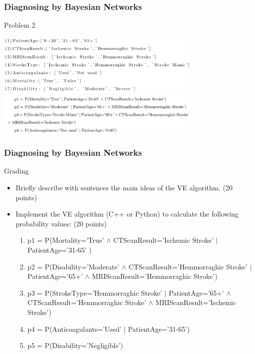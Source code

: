 \documentclass{beamer}
\begin{document}
\begin{frame}
  \frametitle{Diagnosing by Bayesian Networks}
  \begin{block}{Problem 2}

\includegraphics[width=10cm]{Pic/e21}
\includegraphics[width=10cm]{Pic/e22}
  \end{block}
\end{frame}



\begin{frame}
  \frametitle{Diagnosing by Bayesian Networks}

  \begin{block}{Grading}
\begin{itemize}
\item Briefly describe with sentences the main ideas of  the VE algorithm. (20 points)

\item Implement the VE algorithm (C++ or Python) to calculate the following probability values: (20 points)
    
\begin{enumerate}
\item p1 = P(Mortality='True' $\land$ CTScanResult='Ischemic Stroke' $|$ PatientAge='31-65' )

\item p2 = P(Disability='Moderate' $\land$ CTScanResult='Hemmorraghic Stroke' $|$ PatientAge='65+' $\land$  MRIScanResult='Hemmorraghic Stroke')

\item p3 = P(StrokeType='Hemmorraghic Stroke' $|$ PatientAge='65+' $\land$ CTScanResult='Hemmorraghic Stroke' $\land$ MRIScanResult='Ischemic Stroke')

\item p4 = P(Anticoagulants='Used' $|$ PatientAge='31-65')

\item p5 = P(Disability='Negligible')
\end{enumerate}



    \end{itemize}
  \end{block}
\end{frame}
\end{document}
